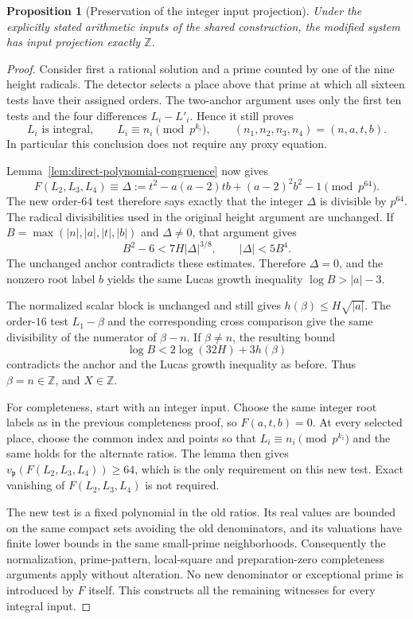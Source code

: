 \documentclass[11pt]{article}
\newtheorem{proposition}[theorem]{Proposition}
\theoremstyle{definition}
\begin{document}
\begin{proposition}[Preservation of the integer input projection]
\label{prop:direct-Lucas-preservation}
Under the explicitly stated arithmetic inputs of the shared
construction, the modified system has input projection exactly
$\mathbb Z$.
\end{proposition}
\begin{proof}
Consider first a rational solution and a prime counted by one
of the nine height radicals.  The detector selects a place
above that prime at which all sixteen tests have their assigned
orders.  The two-anchor argument uses only the first ten tests
and the four differences $L_i-L'_i$.  Hence it still proves
\[
 L_i\text{ is integral},\qquad
 L_i\equiv n_i\pmod{p^{k_i}},
 \qquad(n_1,n_2,n_3,n_4)=(n,a,t,b).
\]
In particular this conclusion does not require any proxy equation.

Lemma~\ref{lem:direct-polynomial-congruence} now gives
\[
 F(L_2,L_3,L_4)\equiv
 \Delta:=t^2-a(a-2)tb+(a-2)^2b^2-1\pmod{p^{64}}.
\]
The new order-$64$ test therefore says exactly that the integer
$\Delta$ is divisible by $p^{64}$.  The radical divisibilities
used in the original height argument are unchanged.  If
$B=\max(|n|,|a|,|t|,|b|)$ and $\Delta\ne0$, that argument
gives
\[
 B^2-6<7H|\Delta|^{3/8},\qquad |\Delta|<5B^4.
\]
The unchanged anchor contradicts these estimates.  Therefore
$\Delta=0$, and the nonzero root label $b$ yields the same
Lucas growth inequality $\log B>|a|-3$.

The normalized scalar block is unchanged and still gives
$h(\beta)\le H\sqrt{|a|}$.  The order-$16$ test $L_1-\beta$
and the corresponding cross comparison give the same divisibility
of the numerator of $\beta-n$.  If $\beta\ne n$, the resulting
bound
\[
                    \log B<2\log(32H)+3h(\beta)
\]
contradicts the anchor and the Lucas growth inequality as before.
Thus $\beta=n\in\mathbb Z$, and $X\in\mathbb Z$.

For completeness, start with an integer input.  Choose the same
integer root labels as in the previous completeness proof, so
$F(a,t,b)=0$.  At every selected place, choose the common index
and points so that $L_i\equiv n_i\pmod{p^{k_i}}$ and the same
holds for the alternate ratios.  The lemma then gives
$v_{\mathfrak p}(F(L_2,L_3,L_4))\ge64$, which is the only
requirement on this new test.  Exact vanishing of $F(L_2,L_3,L_4)$
is not required.

The new test is a fixed polynomial in the old ratios.  Its real
values are bounded on the same compact sets avoiding the old
denominators, and its valuations have finite lower bounds in the
same small-prime neighborhoods.  Consequently the normalization,
prime-pattern, local-square and preparation-zero completeness
arguments apply without alteration.  No new denominator or
exceptional prime is introduced by $F$ itself.  This constructs
all the remaining witnesses for every integral input.
\end{proof}
\end{document}
